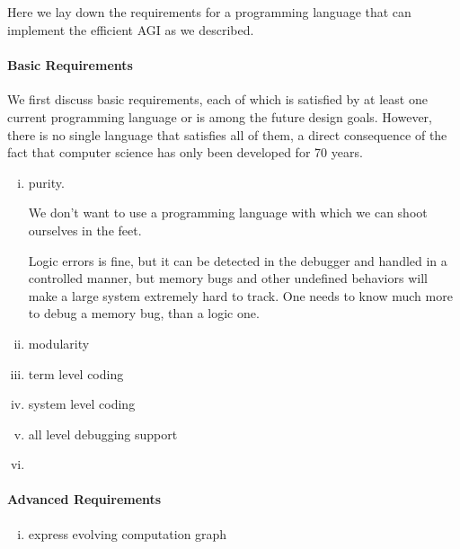 \documentclass[11pt, oneside]{article}   	%
\theoremstyle{definition}
\begin{document}
\subsection{}

\subsection{}

Here we lay down the requirements for a programming language that can implement the efficient AGI as we described.

\paragraph{Basic Requirements} We first discuss basic requirements, each of which is satisfied by at least one current programming language or is among the future design goals. However, there is no single language that satisfies all of them, a direct consequence of the fact that computer science has only been developed for 70 years.

\begin{enumerate}[(i)]
	\item purity.


We don't want to use a programming language with which we can shoot ourselves in the feet.

Logic errors is fine, but it can be detected in the debugger and handled in a controlled manner, but memory bugs and other undefined behaviors will make a large system extremely hard to track. One needs to know much more to debug a memory bug, than a logic one.

	\item modularity
	\item term level coding
	\item system level coding
	\item all level debugging support
	\item 
\end{enumerate}

\paragraph{Advanced Requirements}

\begin{enumerate} [(i)]
	\item express evolving computation graph
\end{enumerate}
\end{document}
